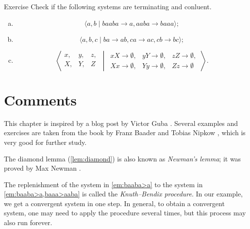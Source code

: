 \begin{thm}{Exercise}\label{ex:convergent}
Check if the following systems are terminating and conluent.

\begin{enumerate}[(a)]
 \item\label{ex:convergent:a} \[\langle a, b \mid baaba\to a, aaba \to  baaa\rangle;\]
 \item\label{ex:convergent:b} \[\langle a,b,c \mid ba\to ab, ca\to ac, cb\to bc \rangle;\]
 \item\label{ex:convergent:c} \[\left\langle
\begin{matrix}
x,&y,&z,
\\
X,&Y,&Z
\end{matrix}
\,
\middle| 
\,
\begin{matrix}
xX\to \emptyset,& yY\to \emptyset,& zZ\to \emptyset,
\\
Xx\to \emptyset,& Yy\to \emptyset,& Zz\to \emptyset
\end{matrix}
\,
\right\rangle.\]
\end{enumerate}

\end{thm}

\section{Comments}

This chapter is inspired by a blog post by Victor Guba \cite{guba}.
Several examples and exercises are taken from the book by Franz Baader and Tobias Nipkow \cite{baader-nipkow},
which is very good for further study.

The diamond lemma (\ref{lem:diamond}) is also known as \emph{Newman's lemma};
it was proved by Max Newman \cite[Theorem 3]{newman}.

The replenishment of the system in \ref{em:baaba>a} to the system in \ref{em:baaba>a,baaa>aaba} is called  the \emph{Knuth--Bendix procedure}.
In our example, we get a convergent system in one step.
In general, to obtain a convergent system, one may need to apply the procedure several times, but this process may also run forever.




